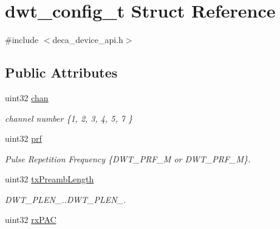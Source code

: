 \hypertarget{structdwt__config__t}{\section{dwt\-\_\-config\-\_\-t Struct Reference}
\label{structdwt__config__t}
}


{\ttfamily \#include $<$deca\-\_\-device\-\_\-api.\-h$>$}

\subsection*{Public Attributes}
\begin{DoxyCompactItemize}
\item 
\hypertarget{structdwt__config__t_ad834c63b6432a3456a2178d9928383ef}{uint32 \hyperlink{structdwt__config__t_ad834c63b6432a3456a2178d9928383ef}{chan}}\label{structdwt__config__t_ad834c63b6432a3456a2178d9928383ef}

\begin{DoxyCompactList}\small\item\em channel number \{1, 2, 3, 4, 5, 7 \} \end{DoxyCompactList}\item 
\hypertarget{structdwt__config__t_ab0651f31acfd31d003151f3d9098c5d7}{uint32 \hyperlink{structdwt__config__t_ab0651f31acfd31d003151f3d9098c5d7}{prf}}\label{structdwt__config__t_ab0651f31acfd31d003151f3d9098c5d7}

\begin{DoxyCompactList}\small\item\em Pulse Repetition Frequency \{D\-W\-T\-\_\-\-P\-R\-F\-\_\-M or D\-W\-T\-\_\-\-P\-R\-F\-\_\-M\}. \end{DoxyCompactList}\item 
\hypertarget{structdwt__config__t_a76d7c23c843254e786ba7a8ecc4b14c4}{uint32 \hyperlink{structdwt__config__t_a76d7c23c843254e786ba7a8ecc4b14c4}{tx\-Preamb\-Length}}\label{structdwt__config__t_a76d7c23c843254e786ba7a8ecc4b14c4}

\begin{DoxyCompactList}\small\item\em D\-W\-T\-\_\-\-P\-L\-E\-N\-\_..D\-W\-T\-\_\-\-P\-L\-E\-N\-\_. \end{DoxyCompactList}\item 
\hypertarget{structdwt__config__t_a258ce1666a801af1a7ead8021d1de779}{uint32 \hyperlink{structdwt__config__t_a258ce1666a801af1a7ead8021d1de779}{rx\-P\-A\-C}}\label{structdwt__config__t_a258ce1666a801af1a7ead8021d1de779}


\end{DoxyCompactItemize}
